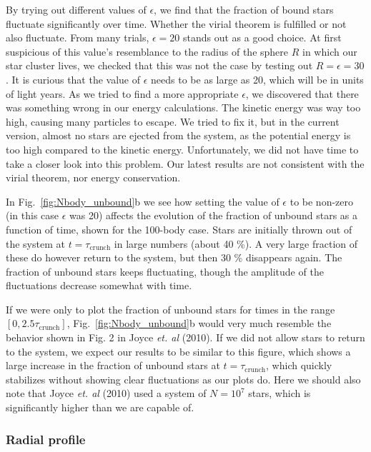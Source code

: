 \documentclass{article}
\begin{document}
\begin{multicols}{2}
By trying out different values of $\epsilon$, we find that the fraction of bound stars fluctuate significantly over time. Whether the virial theorem is fulfilled or not also fluctuate. From many trials, $\epsilon = 20$ stands out as a good choice. At first suspicious of this value's resemblance to the radius of the sphere $R$ in which our star cluster lives, we checked that this was not the case by testing out $R = \epsilon = 30$. 
It is curious that the value of $\epsilon$ needs to be as large as 20, which will be in units of light years. As we tried to find a more appropriate $\epsilon$, we discovered that there was something wrong in our energy calculations. The kinetic energy was way too high, causing many particles to escape. We tried to fix it, but in the current version, almost no stars are ejected from the system, as the potential energy is too high compared to the kinetic energy. Unfortunately, we did not have time to take a closer look into this problem. Our latest results are not consistent with the virial theorem, nor energy conservation.

In Fig.~\ref{fig:Nbody_unbound}b we see how setting the value of $\epsilon$ to be non-zero (in this case $\epsilon$ was 20) affects the evolution of the fraction of unbound stars as a function of time, shown for the 100-body case. Stars are initially thrown out of the system at $t = \tau_{\mathrm{crunch}}$ in large numbers (about 40 \%). A very large fraction of these do however return to the system, but then 30 \% disappears again. The fraction of unbound stars keeps fluctuating, though the amplitude of the fluctuations decrease somewhat with time.

If we were only to plot the fraction of unbound stars for times in the range $[0,2.5\tau_{\mathrm{crunch}}]$, Fig.~\ref{fig:Nbody_unbound}b would very much resemble the behavior shown in Fig. 2 in Joyce \textit{et. al} (2010). If we did not allow stars to return to the system, we expect our results to be similar to this figure, which shows a large increase in the fraction of unbound stars at $t = \tau_{\mathrm{crunch}}$, which quickly stabilizes without showing clear fluctuations as our plots do. Here we should also note that Joyce \textit{et. al} (2010) used a system of $N = 10^7$ stars, which is significantly higher than we are capable of.



\subsubsection{Radial profile}


\end{multicols}
\end{document}
